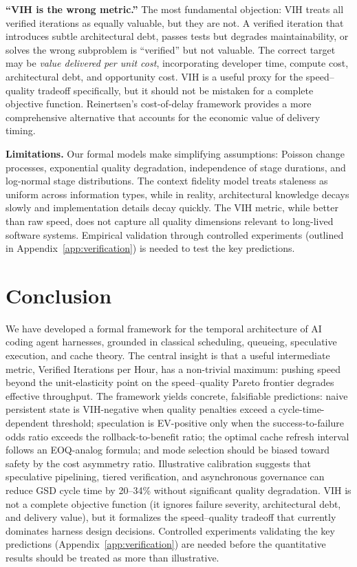 \documentclass[11pt,a4paper]{article}
\theoremstyle{definition}
\theoremstyle{remark}
\begin{document}
\textbf{``VIH is the wrong metric.''} The most fundamental objection: VIH treats all verified iterations as equally valuable, but they are not. A verified iteration that introduces subtle architectural debt, passes tests but degrades maintainability, or solves the wrong subproblem is ``verified'' but not valuable. The correct target may be \emph{value delivered per unit cost}, incorporating developer time, compute cost, architectural debt, and opportunity cost. VIH is a useful proxy for the speed--quality tradeoff specifically, but it should not be mistaken for a complete objective function. Reinertsen's cost-of-delay framework provides a more comprehensive alternative that accounts for the economic value of delivery timing.

\textbf{Limitations.} Our formal models make simplifying assumptions: Poisson change processes, exponential quality degradation, independence of stage durations, and log-normal stage distributions. The context fidelity model treats staleness as uniform across information types, while in reality, architectural knowledge decays slowly and implementation details decay quickly. The VIH metric, while better than raw speed, does not capture all quality dimensions relevant to long-lived software systems. Empirical validation through controlled experiments (outlined in Appendix~\ref{app:verification}) is needed to test the key predictions.


\section{Conclusion}\label{sec:conclusion}

We have developed a formal framework for the temporal architecture of AI coding agent harnesses, grounded in classical scheduling, queueing, speculative execution, and cache theory. The central insight is that a useful intermediate metric, Verified Iterations per Hour, has a non-trivial maximum: pushing speed beyond the unit-elasticity point on the speed--quality Pareto frontier degrades effective throughput. The framework yields concrete, falsifiable predictions: naive persistent state is VIH-negative when quality penalties exceed a cycle-time-dependent threshold; speculation is EV-positive only when the success-to-failure odds ratio exceeds the rollback-to-benefit ratio; the optimal cache refresh interval follows an EOQ-analog formula; and mode selection should be biased toward safety by the cost asymmetry ratio. Illustrative calibration suggests that speculative pipelining, tiered verification, and asynchronous governance can reduce GSD cycle time by 20--34\% without significant quality degradation. VIH is not a complete objective function (it ignores failure severity, architectural debt, and delivery value), but it formalizes the speed--quality tradeoff that currently dominates harness design decisions. Controlled experiments validating the key predictions (Appendix~\ref{app:verification}) are needed before the quantitative results should be treated as more than illustrative.
\end{document}
